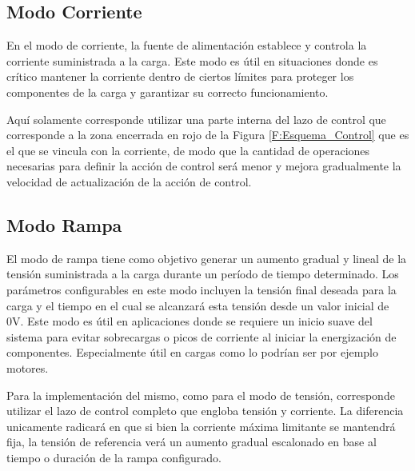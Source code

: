 \subsection{Modo Corriente}
En el modo de corriente, la fuente de alimentación establece y controla la corriente suministrada a la carga. Este modo es útil en situaciones donde es crítico mantener la corriente dentro de ciertos límites para proteger los componentes de la carga y garantizar su correcto funcionamiento.\par 
Aquí solamente corresponde utilizar una parte interna del lazo de control que corresponde a la zona encerrada en rojo de la Figura \ref{F:Esquema_Control} que es el que se vincula con la corriente, de modo que la cantidad de operaciones necesarias para definir la acción de control será menor y mejora gradualmente la velocidad de actualización de la acción de control. \par

\subsection{Modo Rampa}
El modo de rampa tiene como objetivo generar un aumento gradual y lineal de la tensión suministrada a la carga durante un período de tiempo determinado. Los parámetros configurables en este modo incluyen la tensión final deseada para la carga y el tiempo en el cual se alcanzará esta tensión desde un valor inicial de 0V. Este modo es útil en aplicaciones donde se requiere un inicio suave del sistema para evitar sobrecargas o picos de corriente al iniciar la energización de componentes. Especialmente útil en cargas como lo podrían ser por ejemplo motores.\par 
Para la implementación del mismo, como para el modo de tensión, corresponde utilizar el lazo de control completo que engloba tensión y corriente. La diferencia unicamente radicará en que si bien la corriente máxima limitante se mantendrá fija, la tensión de referencia verá un aumento gradual escalonado en base al tiempo o duración de la rampa configurado. \par

